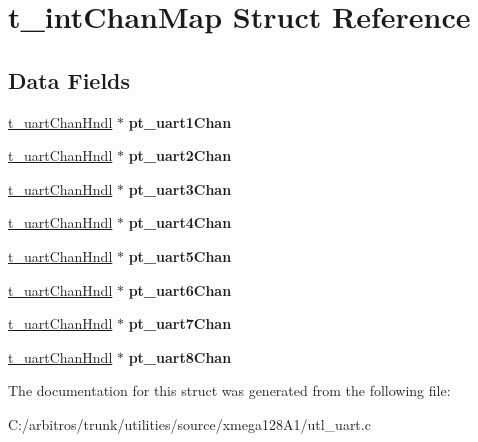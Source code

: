 \hypertarget{structt__int_chan_map}{\section{t\-\_\-int\-Chan\-Map Struct Reference}
\label{structt__int_chan_map}
}
\subsection*{Data Fields}
\begin{DoxyCompactItemize}
\item 
\hypertarget{structt__int_chan_map_a421cdf39b917081379716dd6f5e4ede9}{\hyperlink{structt__uart_chan_hndl}{t\-\_\-uart\-Chan\-Hndl} $\ast$ {\bfseries pt\-\_\-uart1\-Chan}}\label{structt__int_chan_map_a421cdf39b917081379716dd6f5e4ede9}

\item 
\hypertarget{structt__int_chan_map_a40f355b5bc964674fee9fc036980b3ce}{\hyperlink{structt__uart_chan_hndl}{t\-\_\-uart\-Chan\-Hndl} $\ast$ {\bfseries pt\-\_\-uart2\-Chan}}\label{structt__int_chan_map_a40f355b5bc964674fee9fc036980b3ce}

\item 
\hypertarget{structt__int_chan_map_acb69f24445779589ac6e0e1863e5cabb}{\hyperlink{structt__uart_chan_hndl}{t\-\_\-uart\-Chan\-Hndl} $\ast$ {\bfseries pt\-\_\-uart3\-Chan}}\label{structt__int_chan_map_acb69f24445779589ac6e0e1863e5cabb}

\item 
\hypertarget{structt__int_chan_map_a73a44bcb8e12fde62025fc71a25fac1e}{\hyperlink{structt__uart_chan_hndl}{t\-\_\-uart\-Chan\-Hndl} $\ast$ {\bfseries pt\-\_\-uart4\-Chan}}\label{structt__int_chan_map_a73a44bcb8e12fde62025fc71a25fac1e}

\item 
\hypertarget{structt__int_chan_map_ab540d54f548bfb55d013c0006e18245e}{\hyperlink{structt__uart_chan_hndl}{t\-\_\-uart\-Chan\-Hndl} $\ast$ {\bfseries pt\-\_\-uart5\-Chan}}\label{structt__int_chan_map_ab540d54f548bfb55d013c0006e18245e}

\item 
\hypertarget{structt__int_chan_map_ac4d5321cccf26f61163de4eaac587000}{\hyperlink{structt__uart_chan_hndl}{t\-\_\-uart\-Chan\-Hndl} $\ast$ {\bfseries pt\-\_\-uart6\-Chan}}\label{structt__int_chan_map_ac4d5321cccf26f61163de4eaac587000}

\item 
\hypertarget{structt__int_chan_map_ab9fad8e4c401cf604bf04332da4bf68d}{\hyperlink{structt__uart_chan_hndl}{t\-\_\-uart\-Chan\-Hndl} $\ast$ {\bfseries pt\-\_\-uart7\-Chan}}\label{structt__int_chan_map_ab9fad8e4c401cf604bf04332da4bf68d}

\item 
\hypertarget{structt__int_chan_map_a9dd90b619a41c36e9b2dc5cc3a85ffe5}{\hyperlink{structt__uart_chan_hndl}{t\-\_\-uart\-Chan\-Hndl} $\ast$ {\bfseries pt\-\_\-uart8\-Chan}}\label{structt__int_chan_map_a9dd90b619a41c36e9b2dc5cc3a85ffe5}

\end{DoxyCompactItemize}


The documentation for this struct was generated from the following file\-:\begin{DoxyCompactItemize}
\item 
C\-:/arbitros/trunk/utilities/source/xmega128\-A1/utl\-\_\-uart.\-c\end{DoxyCompactItemize}
